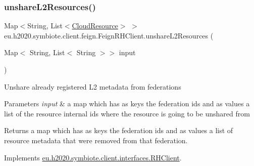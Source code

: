 \mbox{\label{classeu_1_1h2020_1_1symbiote_1_1client_1_1feign_1_1FeignRHClient_aaac584d86c2d5c63dbfe1a367fc3bd24}} 
\subsubsection{\texorpdfstring{unshare\+L2\+Resources()}{unshareL2Resources()}}
{\footnotesize\ttfamily Map$<$String, List$<$\hyperlink{classeu_1_1h2020_1_1symbiote_1_1cloud_1_1model_1_1internal_1_1CloudResource}{Cloud\+Resource}$>$ $>$ eu.\+h2020.\+symbiote.\+client.\+feign.\+Feign\+R\+H\+Client.\+unshare\+L2\+Resources (\begin{DoxyParamCaption}\item[{Map$<$ String, List$<$ String $>$$>$}]{input }\end{DoxyParamCaption})}

Unshare already registered L2 metadata from federations 
\begin{DoxyParams}{Parameters}
{\em input} & a map which has as keys the federation ids and as values a list of the resource internal ids where the resource is going to be unshared from \\
\hline
\end{DoxyParams}
\begin{DoxyReturn}{Returns}
a map which has as keys the federation ids and as values a list of resource metadata that were removed from that federation. 
\end{DoxyReturn}


Implements \hyperlink{interfaceeu_1_1h2020_1_1symbiote_1_1client_1_1interfaces_1_1RHClient_a0570ca0fb6285f0e9900429c93a83de3}{eu.\+h2020.\+symbiote.\+client.\+interfaces.\+R\+H\+Client}.

\mbox{\label{classeu_1_1h2020_1_1symbiote_1_1client_1_1feign_1_1FeignRHClient_a447837da729d2022e118cb22887d993d}} 

